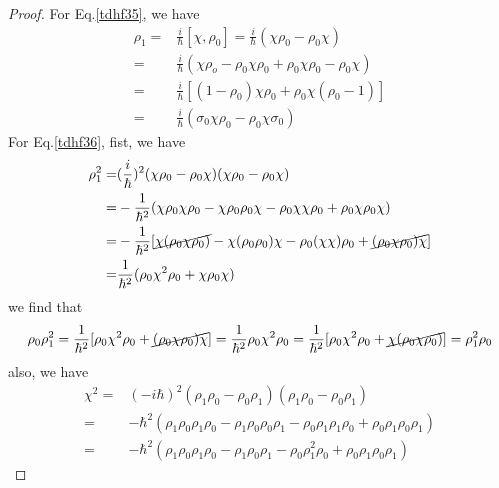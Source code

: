   \begin{proof}
    For Eq.\eqref{tdhf35}, we have
    \begin{equation}
      \begin{aligned} 
      \rho_1 =& \frac{i}{\hbar}[\chi,\rho_0] = \frac{i}{\hbar}(\chi\rho_0 - \rho_0\chi) \\          \label{tdhf40}
             =& \frac{i}{\hbar}(\chi\rho_o - \rho_0\chi\rho_0 + \rho_0\chi\rho_0 - \rho_0\chi)  \\
             =& \frac{i}{\hbar}[(1-\rho_0)\chi\rho_0 + \rho_0\chi(\rho_0 - 1)]  \\
             =& \frac{i}{\hbar}(\sigma_0\chi\rho_0 - \rho_0\chi\sigma_0)
      \end{aligned}
    \end{equation}
    For Eq.\eqref{tdhf36}, fist, we have
    \begin{equation}
      \begin{aligned}
        \rho_1^2 =& (\frac{i}{\hbar})^2(\chi\rho_0-\rho_0\chi)(\chi\rho_0-\rho_0\chi)\\               \label{tdhf41}
                 =& -\frac{1}{\hbar^2}(\chi\rho_0\chi\rho_0 - \chi\rho_0\rho_0\chi - \rho_0\chi\chi\rho_0 + \rho_0\chi\rho_0\chi) \\
                 =& -\frac{1}{\hbar^2}[\cancel{\chi(\rho_0\chi\rho_0)} - \chi(\rho_0\rho_0)\chi - \rho_0(\chi\chi)\rho_0 + \cancel{(\rho_0\chi\rho_0)\chi}]\\
                 =& \frac{1}{\hbar^2}(\rho_0\chi^2\rho_0 + \chi\rho_0\chi)
      \end{aligned}
    \end{equation}
    we find that
    \begin{equation}
        \rho_0\rho_1^2 = \frac{1}{\hbar^2}[\rho_0\chi^2\rho_0 + \cancel{(\rho_0\chi\rho_0)\chi}]= \frac{1}{\hbar^2}\rho_0\chi^2\rho_0 = \frac{1}{\hbar^2}[\rho_0\chi^2\rho_0 + \cancel{\chi(\rho_0\chi\rho_0)}] = \rho_1^2\rho_0  \label{tdhf42}
    \end{equation}
    also, we have
    \begin{equation}
      \begin{aligned}
        \chi^2 =& (-i\hbar)^2(\rho_1\rho_0 - \rho_0\rho_1)(\rho_1\rho_0 - \rho_0\rho_1)\\     \label{tdhf43}
               =& -\hbar^2(\rho_1\rho_0\rho_1\rho_0 - \rho_1\rho_0\rho_0\rho_1 -\rho_0\rho_1\rho_1\rho_0 + \rho_0\rho_1\rho_0\rho_1)\\
               =& -\hbar^2(\rho_1\rho_0\rho_1\rho_0 - \rho_1\rho_0\rho_1 -\rho_0\rho_1^2\rho_0 + \rho_0\rho_1\rho_0\rho_1)

\end{aligned}
\end{equation}
\end{proof}

